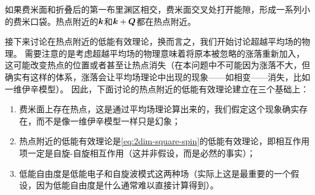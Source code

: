 如果费米面和折叠后的第一布里渊区相交，费米面交叉处打开能隙，形成一系列小的费米口袋。热点附近的$\vb*{k}$和$\vb*{k} + \vb*{Q}$都在热点附近。

接下来讨论在热点附近的低能有效理论，换而言之，我们开始讨论超越平均场的物理。
需要注意的是考虑超越平均场的物理意味着将原本被忽略的涨落重新加入，这可能改变热点的位置或者甚至让热点消失（在本问题中不可能因为涨落不大，但确实有这样的体系，涨落会让平均场理论中出现的现象——如相变——消失，比如一维伊辛模型）。
因此，下面讨论的热点附近的低能有效理论建立在三个基础上：
\begin{enumerate}
    \item 费米面上存在热点，这是通过平均场理论算出来的，我们假定这个现象确实存在，而不是像一维伊辛模型一样只是幻象；
    \item 热点附近的低能有效理论是\eqref{eq:2dim-square-spin}的低能有效理论，即相互作用项一定是自旋-自旋相互作用（这并非假设，而是必然的事实）；
    \item 低能自由度是低能电子和自旋波模式这两种场（实际上这是最重要的一个假设，因为低能自由度是什么通常难以直接计算得到）。
\end{enumerate}

